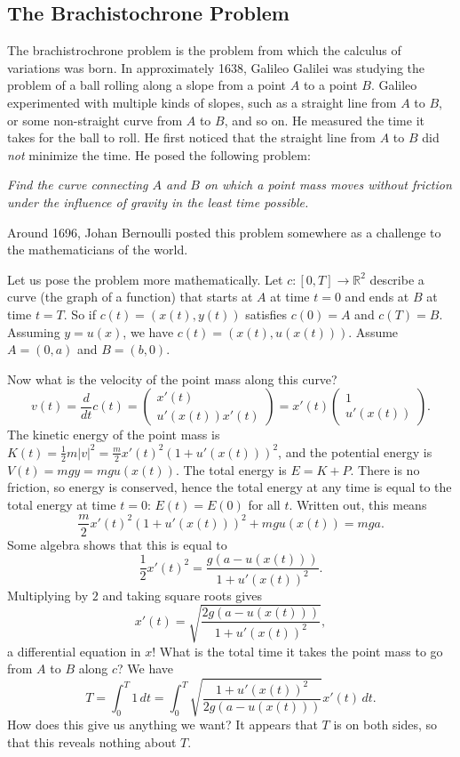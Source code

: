 \documentclass[11pt]{article}
\newcommand{\R}{\mathbb{R}}
\begin{document}
\subsection{The Brachistochrone Problem}

The brachistrochrone problem is the problem from which the calculus of variations was born. In approximately 1638, Galileo Galilei was studying the problem of a ball rolling along a slope from a point $A$ to a point $B$. Galileo experimented with multiple kinds of slopes, such as a straight line from $A$ to $B$, or some non-straight curve from $A$ to $B$, and so on. He measured the time it takes for the ball to roll. He first noticed that the straight line from $A$ to $B$ did \emph{not} minimize the time. He posed the following problem: 

\emph{Find the curve connecting $A$ and $B$ on which a point mass moves without friction under the influence of gravity in the least time possible.}

Around 1696, Johan Bernoulli posted this problem somewhere as a challenge to the mathematicians of the world.

Let us pose the problem more mathematically. Let $c : [0, T] \to \R^2$ describe a curve (the graph of a function) that starts at $A$ at time $t = 0$ and ends at $B$ at time $t = T$. So if $c(t) = (x(t), y(t))$ satisfies $c(0) = A$ and $c(T) = B$. Assuming $y = u(x)$, we have $c(t) = (x(t), u(x(t)))$. Assume $A = (0, a)$ and $B = (b, 0)$.

Now what is the velocity of the point mass along this curve?
\[
v(t) = \frac{d}{dt} c(t) = \begin{pmatrix}
x'(t) \\ u'(x(t))x'(t)
\end{pmatrix} = x'(t) \begin{pmatrix}
1 \\ u'(x(t))
\end{pmatrix}.
\]
The kinetic energy of the point mass is $K(t) = \frac{1}{2} m|v|^2 = \frac{m}{2}x'(t)^2 (1 + u'(x(t)))^2$, and the potential energy is $V(t) = mgy = mgu(x(t))$. The total energy is $E = K + P$. There is no friction, so energy is conserved, hence the total energy at any time is equal to the total energy at time $t = 0$: $E(t) = E(0)$ for all $t$. Written out, this means
\[
\frac{m}{2}x'(t)^2(1 + u'(x(t)))^2 + mgu(x(t)) = mga.
\]
Some algebra shows that this is equal to
\[
\frac{1}{2}x'(t)^2 = \frac{g(a - u(x(t)))}{1 + u'(x(t))^2}.
\]
Multiplying by $2$ and taking square roots gives
\[
x'(t) = \sqrt{\frac{2g(a - u(x(t)))}{1 + u'(x(t))^2}},
\]
a differential equation in $x$! What is the total time it takes the point mass to go from $A$ to $B$ along $c$? We have
\[
\tag{*}
T = \int_0^T 1 \, dt = \int_0^T \sqrt{\frac{1 + u'(x(t))^2}{2g(a - u(x(t)))}}x'(t) \, dt.
\]
How does this give us anything we want? It appears that $T$ is on both sides, so that this reveals nothing about $T$.
\end{document}

